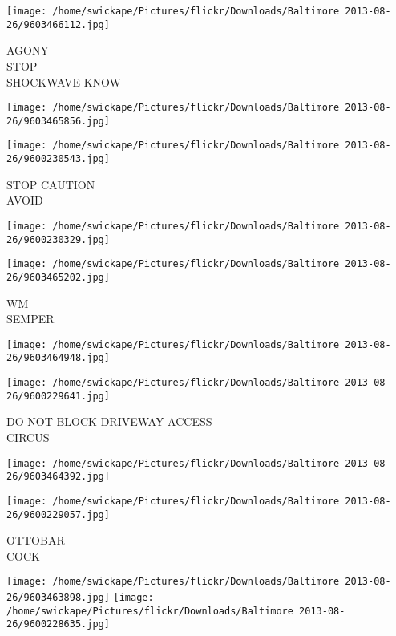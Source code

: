 \documentclass[10pt,letterpaper]{article}
\begin{document}
\vspace{0.25in}
\texttt{[image: /home/swickape/Pictures/flickr/Downloads/Baltimore 2013-08-26/9603466112.jpg]}

AGONY\\
STOP\\
SHOCKWAVE KNOW\\
\pagebreak

\texttt{[image: /home/swickape/Pictures/flickr/Downloads/Baltimore 2013-08-26/9603465856.jpg]}

\vspace{0.25in}
\texttt{[image: /home/swickape/Pictures/flickr/Downloads/Baltimore 2013-08-26/9600230543.jpg]}

STOP CAUTION\\
AVOID\\
\pagebreak

\texttt{[image: /home/swickape/Pictures/flickr/Downloads/Baltimore 2013-08-26/9600230329.jpg]}

\vspace{0.25in}
\texttt{[image: /home/swickape/Pictures/flickr/Downloads/Baltimore 2013-08-26/9603465202.jpg]}

WM\\
SEMPER\\
\pagebreak

\texttt{[image: /home/swickape/Pictures/flickr/Downloads/Baltimore 2013-08-26/9603464948.jpg]}

\vspace{0.25in}
\texttt{[image: /home/swickape/Pictures/flickr/Downloads/Baltimore 2013-08-26/9600229641.jpg]}

DO NOT BLOCK DRIVEWAY ACCESS\\
CIRCUS\\
\pagebreak

\texttt{[image: /home/swickape/Pictures/flickr/Downloads/Baltimore 2013-08-26/9603464392.jpg]}

\vspace{0.25in}
\texttt{[image: /home/swickape/Pictures/flickr/Downloads/Baltimore 2013-08-26/9600229057.jpg]}

OTTOBAR\\
COCK\\
\pagebreak

\texttt{[image: /home/swickape/Pictures/flickr/Downloads/Baltimore 2013-08-26/9603463898.jpg]}
\texttt{[image: /home/swickape/Pictures/flickr/Downloads/Baltimore 2013-08-26/9600228635.jpg]}
\end{document}
